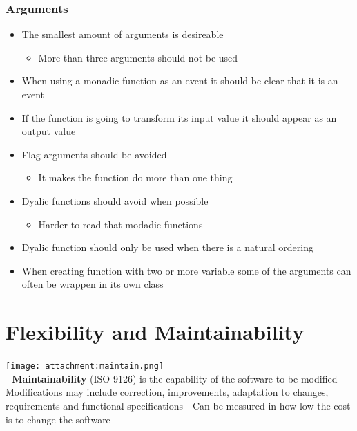 \documentclass[11pt]{article}
\providecommand{\tightlist}{%
      \setlength{\itemsep}{0pt}\setlength{\parskip}{0pt}}
\begin{document}
\hypertarget{arguments}{%
\subsubsection{Arguments}\label{arguments}}

\begin{itemize}
\tightlist
\item
  The smallest amount of arguments is desireable

  \begin{itemize}
  \tightlist
  \item
    More than three arguments should not be used
  \end{itemize}
\item
  When using a monadic function as an event it should be clear that it
  is an event\\
\item
  If the function is going to transform its input value it should appear
  as an output value
\item
  Flag arguments should be avoided

  \begin{itemize}
  \tightlist
  \item
    It makes the function do more than one thing
  \end{itemize}
\item
  Dyalic functions should avoid when possible

  \begin{itemize}
  \tightlist
  \item
    Harder to read that modadic functions
  \end{itemize}
\item
  Dyalic function should only be used when there is a natural ordering
\item
  When creating function with two or more variable some of the arguments
  can often be wrappen in its own class
\end{itemize}

    \hypertarget{flexibility-and-maintainability}{%
\section{Flexibility and
Maintainability}\label{flexibility-and-maintainability}}

\texttt{[image: attachment:maintain.png]}\\
- \textbf{Maintainability} (ISO 9126) is the capability of the software
to be modified - Modifications may include correction, improvements,
adaptation to changes, requirements and functional specifications - Can
be messured in how low the cost is to change the software
\end{document}
